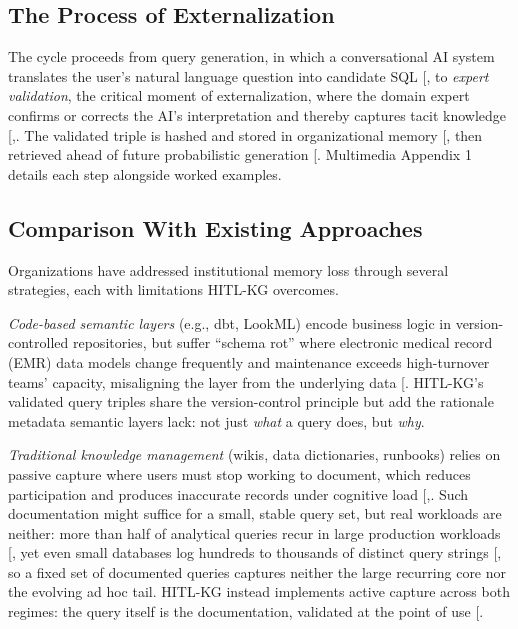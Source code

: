 \documentclass[
  american,
  11pt,
  letterpaper,
  oneside  ,captions=tableheading
]{scrartcl}
\begin{document}
\subsection{The Process of
Externalization}\label{the-process-of-externalization}

The cycle proceeds from query generation, in which a conversational AI
system translates the user's natural language question into candidate
SQL {[}\citeproc{ref-lee2023}{30}{]}, to \emph{expert validation}, the
critical moment of externalization, where the domain expert confirms or
corrects the AI's interpretation and thereby captures tacit knowledge
{[},\citeproc{ref-mosqueirarey2023}{32}{]}.
The validated triple is hashed and stored in organizational memory
{[}\citeproc{ref-benbya2004}{33}{]}, then retrieved ahead of future
probabilistic generation {[}\citeproc{ref-whittaker2008}{34}{]}.
Multimedia Appendix 1 details each step alongside worked examples.

\subsection{Comparison With Existing
Approaches}\label{comparison-with-existing-approaches}

Organizations have addressed institutional memory loss through several
strategies, each with limitations HITL-KG overcomes.

\emph{Code-based semantic layers} (e.g., dbt, LookML) encode business
logic in version-controlled repositories, but suffer ``schema rot''
where electronic medical record (EMR) data models change frequently and
maintenance exceeds high-turnover teams' capacity, misaligning the layer
from the underlying data {[}\citeproc{ref-battula2025}{35}{]}. HITL-KG's
validated query triples share the version-control principle but add the
rationale metadata semantic layers lack: not just \emph{what} a query
does, but \emph{why}.

\emph{Traditional knowledge management} (wikis, data dictionaries,
runbooks) relies on passive capture where users must stop working to
document, which reduces participation and produces inaccurate records
under cognitive load
{[},\citeproc{ref-goffin2011}{26}{]}. Such
documentation might suffice for a small, stable query set, but real
workloads are neither: more than half of analytical queries recur in
large production workloads {[}\citeproc{ref-jindal2019}{36}{]}, yet even
small databases log hundreds to thousands of distinct query strings
{[}\citeproc{ref-kul2018}{37}{]}, so a fixed set of documented queries
captures neither the large recurring core nor the evolving ad hoc tail.
HITL-KG instead implements active capture across both regimes: the query
itself is the documentation, validated at the point of use
{[}\citeproc{ref-moore2018}{28}{]}.
\end{document}
